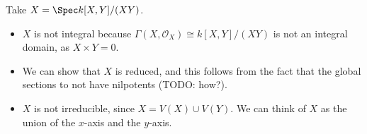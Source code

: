Take $X = \Spec k[X, Y]/(XY)$.
\begin{itemize}
	\item $X$ is not integral because $\Gamma(X, \mathcal{O}_X) \cong k[X, Y]/(XY)$
		is not an integral domain, as $X\times Y = 0$.
	\item We can show that
		$X$ is reduced, and this follows from the fact that the global sections
		to not have nilpotents (TODO: how?).
	\item $X$ is not irreducible, since $X = V(X) \cup V(Y)$. We can think of
		$X$ as the union of the $x$-axis and the $y$-axis.
\end{itemize}
